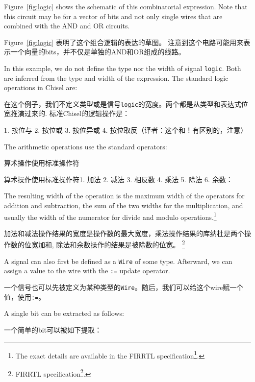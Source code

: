 \documentclass[%
    10pt,
    headinclude, footexclude,
    openright, %
    notitlepage,
    cleardoubleempty,
    headsepline,
    pointlessnumbers,
    bibtotoc, idxtotoc,
    ]{scrbook}
\newcommand{\code}[1]{{\small{\texttt{#1}}}}
\newcommand{\myref}[2]{\href{#1}{#2}}
\renewcommand{\myref}[2]{{#2}{\footnote{\url{#1}}}}
\begin{document}
Figure~\ref{fig:logic} shows the schematic of this combinatorial expression.
Note that this circuit may be for a vector of bits and not only single wires
that are combined with the AND and OR circuits.

Figure~\ref{fig:logic} 表明了这个组合逻辑的表达的草图。
注意到这个电路可能用来表示一个向量的bits，并不仅是单独的AND和OR组成的线路。

In this example, we do not define the type nor the width of signal \code{logic}.
Both are inferred from the type and width of the expression.
The standard logic operations in Chisel are:

在这个例子，我们不定义类型或是信号\code{logic}的宽度。两个都是从类型和表达式位宽推演过来的.
标准Chisel的逻辑操作是：



1. 按位与
2. 按位或
3. 按位异或
4. 按位取反（译者：这个和！有区别的，注意）

\noindent The arithmetic operations use the standard operators:

\noindent 算术操作使用标准操作符


算术操作使用标准操作符1. 加法 2. 减法 3. 相反数 4. 乘法 5. 除法 6. 余数：

\noindent The resulting width of the operation is the maximum width of the operators for
addition and subtraction, the sum of the two widths for the multiplication, and usually
the width of the numerator for divide and modulo operations.\footnote{The exact
details are available in the \myref{https://github.com/freechipsproject/firrtl/blob/master/spec/spec.pdf}{FIRRTL specification}.}

加法和减法操作结果的宽度是操作数的最大宽度，乘法操作结果的库纳杜是两个操作数的位宽加和, 除法和余数操作的结果是被除数的位宽。
\footnote{ \myref{https://github.com/freechipsproject/firrtl/blob/master/spec/spec.pdf}{FIRRTL specification}.}

A signal can also first be defined as a \code{Wire} of some type. Afterward, we can assign a
value to the wire with the \code{:=} update operator.

一个信号也可以先被定义为某种类型的\code{Wire}。随后，我们可以给这个wire赋一个值，使用\code{:=}。


A single bit can be extracted as follows:

一个简单的bit可以被如下提取：
\end{document}
